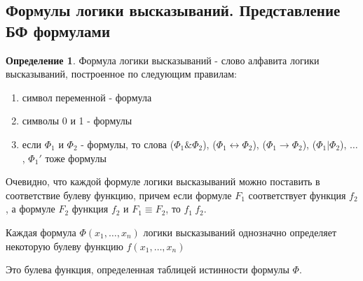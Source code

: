 \documentclass[a4paper]{article}
\theoremstyle{definition}
\newtheorem*{definition}{Определение}
\theoremstyle{remark}
\begin{document}
    \subsection{Формулы логики высказываний. Представление БФ формулами}
    \begin{definition}
        Формула логики высказываний - слово алфавита логики высказываний,
        построенное по следующим правилам:
        \begin{enumerate}
            \item символ переменной - формула
            \item символы 0 и 1 - формулы
            \item если $\Phi_1$ и $\Phi_2$ - формулы, то слова ($\Phi_1 \& \Phi_2$),
            ($\Phi_1 \leftrightarrow \Phi_2$), ($\Phi_1 \rightarrow \Phi_2$), 
            ($\Phi_1 | \Phi_2$), $\dots$ , $\Phi_1 '$ тоже формулы
        \end{enumerate}
    \end{definition}
    Очевидно, что каждой формуле логики высказываний можно поставить в соответствие
    булеву функцию, причем если формуле $F_1$ соответствует функция $f_2$, а 
    формуле $F_2$ функция $f_2$ и $F_1 \equiv F_2$, то $f_1 ~ f_2$.
    
    Каждая формула $\Phi(x_1, \dots, x_n)$ логики высказываний однозначно
    определяет некоторую булеву функцию $f(x_1, \dots, x_n)$

    Это булева функция, определенная таблицей истинности
    формулы $\Phi$.
\end{document}
